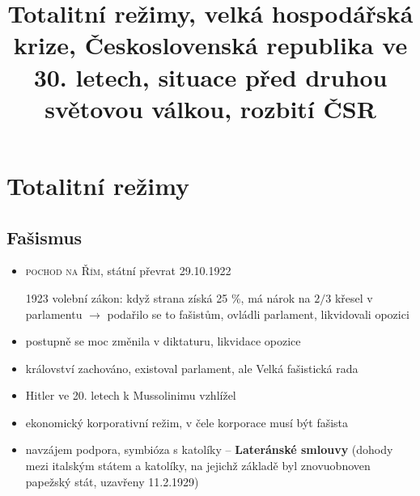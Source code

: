 \documentclass{article}
\title{\vspace{-2cm}Totalitní režimy, velká hospodářská krize, Československá republika ve 30. letech, situace před druhou světovou válkou, rozbití ČSR\vspace{-1.7cm}}
\date{}
\author{}
\begin{document}
\maketitle

\section*{Totalitní režimy}
\subsection*{Fašismus}
\begin{itemize}
    \item \textsc{pochod na Řím}, státní převrat 29.10.1922
    \item[1923] volební zákon: když strana získá 25 \%, má nárok na $2/3$ křesel v parlamentu $\rightarrow$ podařilo se to fašistům, ovládli parlament, likvidovali opozici
    \item postupně se moc změnila v diktaturu, likvidace opozice
    \item království zachováno, existoval parlament, ale Velká fašistická rada
    \item Hitler ve 20. letech k Mussolinimu vzhlížel
    \item ekonomický korporativní režim, v čele korporace musí být fašista
    \item navzájem podpora, symbióza s katolíky -- \textbf{Lateránské smlouvy} (dohody mezi italským státem a katolíky, na jejichž základě byl znovuobnoven papežský stát, uzavřeny 11.2.1929)
\end{itemize}
\end{document}
